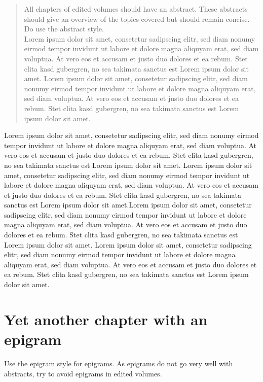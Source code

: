 \begin{abstract}
All chapters of edited volumes should have an abstract. These abstracts should give an overview of the topics covered but should remain concise. Do use the abstract style.\\
Lorem ipsum dolor sit amet, consetetur sadipscing elitr, sed diam nonumy eirmod tempor invidunt ut labore et dolore magna aliquyam erat, sed diam voluptua. At vero eos et accusam et justo duo dolores et ea rebum. Stet clita kasd gubergren, no sea takimata sanctus est Lorem ipsum dolor sit amet. Lorem ipsum dolor sit amet, consetetur sadipscing elitr, sed diam nonumy eirmod tempor invidunt ut labore et dolore magna aliquyam erat, sed diam voluptua. At vero eos et accusam et justo duo dolores et ea rebum. Stet clita kasd gubergren, no sea takimata sanctus est Lorem ipsum dolor sit amet.
\end{abstract}

Lorem ipsum dolor sit amet, consetetur sadipscing elitr, sed diam nonumy eirmod tempor invidunt ut labore et dolore magna aliquyam erat, sed diam voluptua. At vero eos et accusam et justo duo dolores et ea rebum. Stet clita kasd gubergren, no sea takimata sanctus est Lorem ipsum dolor sit amet. Lorem ipsum dolor sit amet, consetetur sadipscing elitr, sed diam nonumy eirmod tempor invidunt ut labore et dolore magna aliquyam erat, sed diam voluptua. At vero eos et accusam et justo duo dolores et ea rebum. Stet clita kasd gubergren, no sea takimata sanctus est Lorem ipsum dolor sit amet.Lorem ipsum dolor sit amet, consetetur sadipscing elitr, sed diam nonumy eirmod tempor invidunt ut labore et dolore magna aliquyam erat, sed diam voluptua. At vero eos et accusam et justo duo dolores et ea rebum. Stet clita kasd gubergren, no sea takimata sanctus est Lorem ipsum dolor sit amet. Lorem ipsum dolor sit amet, consetetur sadipscing elitr, sed diam nonumy eirmod tempor invidunt ut labore et dolore magna aliquyam erat, sed diam voluptua. At vero eos et accusam et justo duo dolores et ea rebum. Stet clita kasd gubergren, no sea takimata sanctus est Lorem ipsum dolor sit amet.

\chapter{Yet another chapter with an epigram}

\begin{styleListenabsatz}
Use the epigram style for epigrams. As epigrams do not go very well with abstracts, try to avoid epigrams in edited volumes.
\end{styleListenabsatz}

